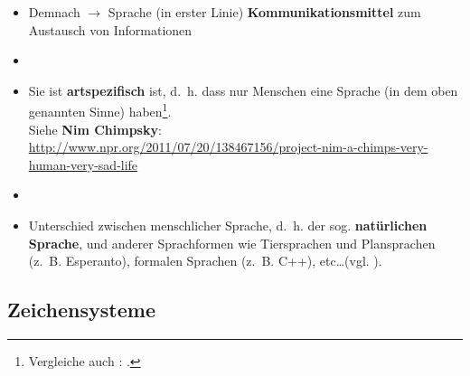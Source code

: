 
\begin{frame}

\begin{itemize}
	\item<1-> Demnach $\rightarrow$ Sprache (in erster Linie) \textbf{Kommunikationsmittel} zum Austausch von Informationen
	\item[]
	\item<2-> Sie ist \textbf{artspezifisch} ist, d.~h. dass nur Menschen eine Sprache (in dem oben genannten Sinne) haben\footnote{Vergleiche auch \citet{Bussmann83a}: .}.\\
	Siehe \textbf{Nim Chimpsky}:\\
	\url{http://www.npr.org/2011/07/20/138467156/project-nim-a-chimps-very-human-very-sad-life}
	\item[]
	\item<3-> Unterschied zwischen menschlicher Sprache, d.~h. der sog. \textbf{natürlichen Sprache}, und anderer Sprachformen wie Tiersprachen und Plansprachen (z.~B. Esperanto), formalen Sprachen (z.~B. C++), etc\dots (vgl. \citet{Thuemmel00a}).\
\end{itemize}		

\end{frame}


%
\subsection{Zeichensysteme}
	

